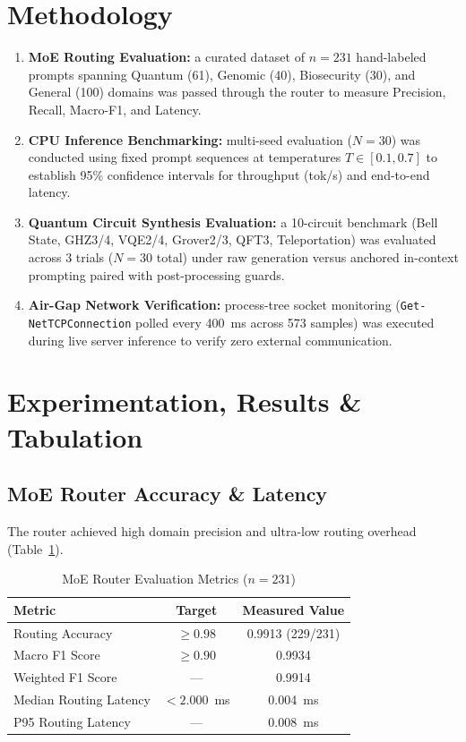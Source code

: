 \documentclass[journal]{IEEEtran}
\begin{document}
\section{Methodology}
\begin{enumerate}
\item \textbf{MoE Routing Evaluation:} a curated dataset of $n=231$
hand-labeled prompts spanning Quantum (61), Genomic (40), Biosecurity (30), and
General (100) domains was passed through the router to measure Precision,
Recall, Macro-F1, and Latency.
\item \textbf{CPU Inference Benchmarking:} multi-seed evaluation ($N=30$) was
conducted using fixed prompt sequences at temperatures
$T\in[0.1, 0.7]$ to establish 95\% confidence intervals for throughput (tok/s)
and end-to-end latency.
\item \textbf{Quantum Circuit Synthesis Evaluation:} a 10-circuit benchmark
(Bell State, GHZ3/4, VQE2/4, Grover2/3, QFT3, Teleportation) was evaluated
across 3 trials ($N=30$ total) under raw generation versus anchored in-context
prompting paired with post-processing guards.
\item \textbf{Air-Gap Network Verification:} process-tree socket monitoring
(\texttt{Get-NetTCPConnection} polled every 400~ms across 573 samples) was
executed during live server inference to verify zero external communication.
\end{enumerate}

\section{Experimentation, Results \& Tabulation}
\subsection{MoE Router Accuracy \& Latency}
The router achieved high domain precision and ultra-low routing overhead
(Table~\ref{tab:router}).

\begin{table}[!t]
\caption{MoE Router Evaluation Metrics ($n=231$)}
\begin{center}
\begin{tabular}{lcc}
\hline
Metric & Target & Measured Value\\
\hline
Routing Accuracy       & $\geq0.98$   & 0.9913 (229/231)\\
Macro F1 Score         & $\geq0.90$   & 0.9934\\
Weighted F1 Score      & ---          & 0.9914\\
Median Routing Latency & $<2.000$~ms & 0.004~ms\\
P95 Routing Latency    & ---          & 0.008~ms\\
\hline
\end{tabular}
\end{center}
\label{tab:router}
\end{table}
\end{document}
